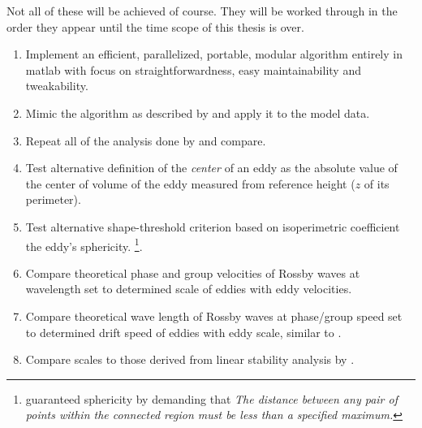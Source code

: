 
\label{sec:goals}



Not all of these will be achieved of course. They will be worked through in the order they appear until the time scope of this thesis is over.
{\bfseries
\begin{enumerate}

\item
Implement an efficient, parallelized, portable, modular algorithm entirely in matlab with focus on straightforwardness, easy maintainability and tweakability.

\item
Mimic the algorithm as described by \cite{Chelton2011} and apply it to the model data.

\item
Repeat all of the analysis done by \cite{Chelton2011} and compare.

\item
Test alternative definition of the \textit{center} of an eddy as the absolute value of the center of volume of the eddy measured from reference height ($z$ of its perimeter).

\item
Test alternative shape-threshold criterion based on isoperimetric coefficient \ie the eddy's sphericity. \footnote{\cite{Chelton2011} guaranteed sphericity by demanding that \textit{The distance between any pair of points within the connected region must be less than a specified maximum.}}.

\item
Compare theoretical phase and group velocities of Rossby waves at wavelength set to determined scale of eddies with eddy velocities.

\item
Compare theoretical wave length of Rossby waves at phase/group speed set to determined drift speed of eddies with eddy scale, similar to \citep{Tulloch2009}.

\item
Compare scales to those derived from linear stability analysis by \eg \cite{Vollmer2013a,eden2012implementing,Smith2009,griesel2013eulerian}.
\end{enumerate}
}


